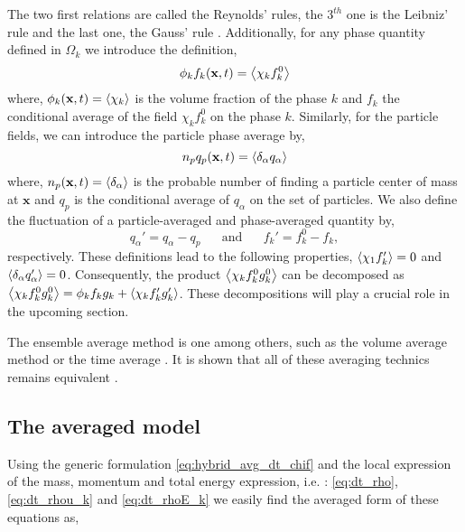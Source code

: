 The two first relations are called the Reynolds' rules, the $3^{th}$ one is the Leibniz' 
rule and the last one, the Gauss' rule \citep{drew1983mathematical}.
Additionally, for any phase quantity defined in $\Omega_k$ we introduce the definition, 
\begin{equation}
    \phi_k f_k (\textbf{x},t) = \left<\chi_k f_k^0\right>
    \label{eq:1_avg}
\end{equation}
where, $\phi_k(\textbf{x},t) = \left<\chi_k\right>$ is the volume fraction of the phase $k$
and $f_k$ the conditional average of the field $\chi_k f_k^0$ on the phase $k$.
Similarly, for the particle fields, we can introduce the particle phase average by,
\begin{equation}
     n_p q_p(\textbf{x},t) = \left<\delta_\alpha q_\alpha\right>
     \label{eq:p_avg}
\end{equation}
where, $n_p(\textbf{x},t) = \left<\delta_\alpha\right>$ is the probable number of finding a particle center of mass at $\textbf{x}$
and $q_p$ is the conditional average of $q_\alpha$ on the set of particles. 
We also define the fluctuation of a particle-averaged and phase-averaged quantity by,
\begin{equation}
    q_\alpha' = q_\alpha - q_p
    \;\;\;\;\;\;\text{and}
    \;\;\;\;\;\;
    f_k' = f_k^0 - f_k,
    \label{eq:def_fluctu}
\end{equation}
respectively. 
These definitions lead to the following properties, $\left<\chi_1 f'_k\right> = 0$ and $\left<\delta_\alpha q_\alpha'\right> =0$. 
Consequently, the product $\left<\chi_k f^0_kg^0_k\right>$ can be decomposed as $\left<\chi_k f_k^0g_k^0\right>=\phi_k f_kg_k + \left<\chi_k f'_kg'_k\right>$. 
These decompositions will play a crucial role in the upcoming section. 

The ensemble average method is one among others, such as the volume average method\citep{jackson1997locally} or the time average
\citep{ishii2010thermo}.
It is shown that all of these averaging technics remains equivalent \citep{jackson1997locally}. 


\subsection{The averaged model}

Using the generic formulation \ref{eq:hybrid_avg_dt_chif} and the local expression of the mass, momentum and total energy expression, i.e. : \ref{eq:dt_rho},\ref{eq:dt_rhou_k} and \ref{eq:dt_rhoE_k} we easily find the averaged form of these equations as, 

